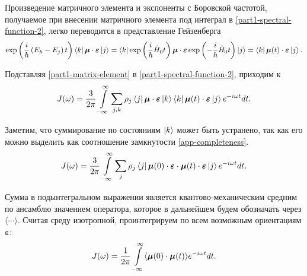 Произведение матричного элемента и экспоненты с Боровской частотой, получаемое при внесении матричного элемента под интеграл в \eqref{part1-spectral-function-2}, легко переводится в представление Гейзенберга
\begin{gather}
    \exp \left( \frac{i}{\hbar} \left( E_k - E_j \right) t \right) \bra{k} \boldsymbol{\mu} \cdot \boldsymbol{\varepsilon} \ket{j} = \bra{k} \exp \left( \frac{i}{\hbar} \hat{H}_0 t \right) \boldsymbol{\mu} \cdot \boldsymbol{\varepsilon} \exp \left( -\frac{i}{\hbar} \hat{H}_0 t \right) \ket{j} = \bra{k} \boldsymbol{\mu}(t) \cdot \boldsymbol{\varepsilon} \ket{j}. \label{part1-matrix-element}
\end{gather}

Подставляя \eqref{part1-matrix-element} в \eqref{part1-spectral-function-2}, приходим к
\begin{gather}
    J(\omega) = \frac{3}{2\pi} \int\limits_{-\infty}^\infty \sum_{j,k} \rho_j \bra{j} \boldsymbol{\mu} \cdot \boldsymbol{\varepsilon} \ket{k} \bra{k} \boldsymbol{\mu}(t) \cdot \boldsymbol{\varepsilon} \ket{j} e^{-i \omega t} dt.
\end{gather}

Заметим, что суммирование по состояниям $\ket{k}$ может быть устранено, так как его можно выделить как соотношение замкнутости \eqref{app-completeness}. 
\begin{gather}
    J(\omega) = \frac{3}{2\pi} \int\limits_{-\infty}^\infty \sum_j  \rho_{j} \bra{j} \boldsymbol{\mu}(0) \cdot \boldsymbol{\varepsilon} \cdot \boldsymbol{\mu}(t) \cdot \boldsymbol{\varepsilon} \ket{j} e^{-i\omega t} dt.
\end{gather}

Сумма в подынтегральном выражении является квантово-механическим средним по ансамблю значением оператора, которое в дальнейшем будем обозначать через $\langle \cdots \rangle$. Считая среду изотропной, проинтегрируем по всем возможным ориентациям $\boldsymbol{\varepsilon}$:
\begin{gather}
    J(\omega) = \frac{1}{2\pi} \int\limits_{-\infty}^\infty \langle  \boldsymbol{\mu}(0) \cdot \boldsymbol{\mu}(t)  \rangle e^{-i \omega t} dt. \label{litreview-spectral-function1}
\end{gather}

